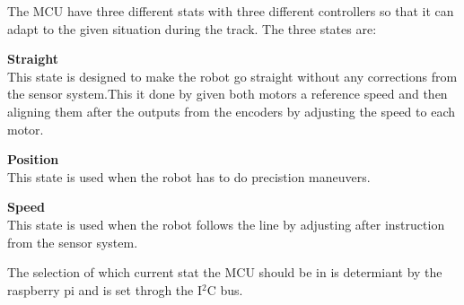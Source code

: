 The MCU have three different stats with three different controllers so that it can adapt to the given situation during the track. The three states are:



\begin{itemize}
	\begin{item}
		\textbf{Straight}\\ This state is designed to make the robot go straight without any corrections from the sensor system.This it done by given both motors a reference speed and then aligning them after the outputs from the encoders by adjusting the speed to each motor. 
	\end{item}
	
	\begin{item}
		\textbf{Position}\\This state is used when the robot has to do precistion maneuvers. 
	\end{item}
	
	\begin{item}
		\textbf{Speed}\\This state is used when the robot follows the line by adjusting after instruction from the sensor system.
	\end{item}

\end{itemize}

The selection of which current stat the MCU should be in is determiant by the raspberry pi and is set throgh the I$^2$C bus.


